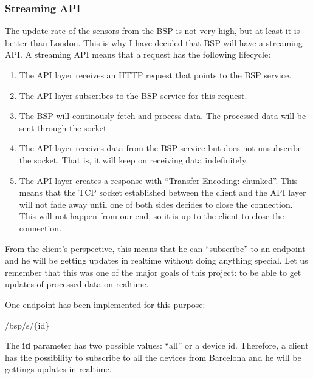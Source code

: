 \subsubsection*{Streaming API}

The update rate of the sensors from the BSP is not very high, but at least it
is better than London. This is why I have decided that BSP will have a
streaming API. A streaming API means that a request has the following lifecycle:

\begin{enumerate}
  \itemsep0em
  \item The API layer receives an HTTP request that points to the BSP service.
  \item The API layer subscribes to the BSP service for this request.
  \item The BSP will continously fetch and process data. The processed data
will be sent through the socket.
  \item The API layer receives data from the BSP service but does not
unsubscribe the socket. That is, it will keep on receiving data indefinitely.
  \item The API layer creates a response with ``Transfer-Encoding: chunked''.
This means that the TCP socket established between the client and the API layer
will not fade away until one of both sides decides to close the connection.
This will not happen from our end, so it is up to the client to close the
connection.
\end{enumerate}

From the client's perspective, this means that he can ``subscribe'' to an
endpoint and he will be getting updates in realtime without doing anything
special. Let us remember that this was one of the major goals of this project:
to be able to get updates of processed data on realtime.

One endpoint has been implemented for this purpose:

\begin{center}
  /bsp/s/\{id\}
\end{center}

The {\bf id} parameter has two possible values: ``all'' or a device id.
Therefore, a client has the possibility to subscribe to all the devices from
Barcelona and he will be gettings updates in realtime.
